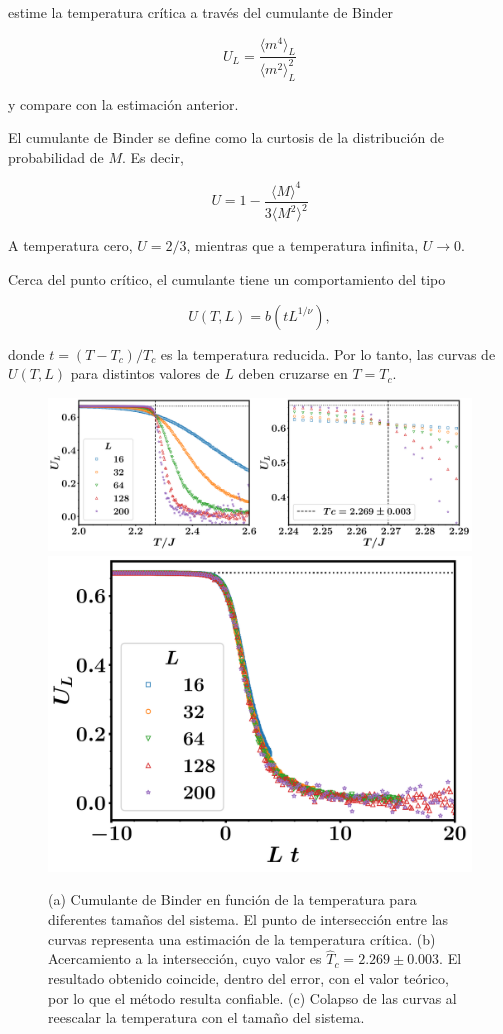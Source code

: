 \documentclass[10pt]{article}
\begin{document}
\begin{enumerate}[a)]
estime la temperatura crítica a través del cumulante de Binder 

\begin{equation}
U_L = \dfrac{\langle m^4 \rangle_L}{\langle m^2 \rangle_L^2}
\end{equation}

y compare con la estimación anterior.

El cumulante de Binder se define como la curtosis de la distribución de probabilidad de $M$. Es decir,

$$
U = 1 - \dfrac{\langle M \rangle^4}{3\langle M^2 \rangle^2}
$$

A temperatura cero, $U = 2/3$, mientras que a temperatura infinita, $U\rightarrow 0$.

Cerca del punto crítico, el cumulante tiene un comportamiento del tipo 

$$
U(T,L) = b(tL^{1/\nu}),
$$

donde $t = (T-T_c)/T_c$ es la temperatura reducida. Por lo tanto, las curvas de $U(T, L)$ para distintos valores de $L$ deben cruzarse en $T=T_c$.

\begin{figure}[ht]
\centering
\includegraphics[scale=0.27]{Fig4.pdf}
\includegraphics[scale=0.27]{Fig5.pdf}
\caption{(a) Cumulante de Binder en función de la temperatura para diferentes tamaños del sistema. El punto de intersección entre las curvas representa una estimación de la temperatura crítica. (b) Acercamiento a la intersección, cuyo valor es $\hat{T}_c = 2.269\pm 0.003$. El resultado obtenido coincide, dentro del error, con el valor teórico, por lo que el método resulta confiable. (c) Colapso de las curvas al reescalar la temperatura con el tamaño del sistema.}
\end{figure}


\end{enumerate}
\end{document}
